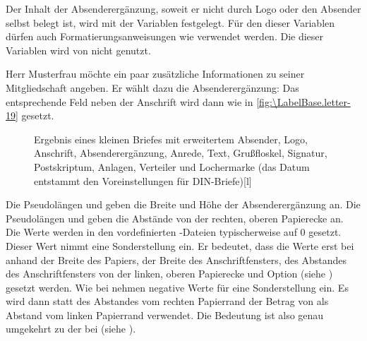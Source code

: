 \begin{Declaration}
\end{Declaration}
Der Inhalt der Absenderergänzung, soweit er nicht durch Logo oder den Absender
selbst belegt ist, wird mit der Variablen  festgelegt. Für
den  dieser Variablen dürfen auch Formatierungsanweisungen wie
 verwendet werden. Die  dieser Variablen
wird von \KOMAScript{} nicht genutzt.

\begin{Example}
  Herr Musterfrau möchte ein paar zusätzliche Informationen zu seiner
  Mitgliedschaft angeben. Er wählt dazu die Absenderergänzung:%
  Das entsprechende Feld neben der Anschrift wird dann wie in
  \autoref{fig:\LabelBase.letter-19} gesetzt.
  \begin{figure}
    \setcapindent{0pt}%
    \begin{captionbeside}{Ergebnis
        eines kleinen Briefes mit erweitertem Absender, Logo, 
        Anschrift, Absenderergänzung, Anrede, Text, Grußfloskel, Signatur,
        Postskriptum, Anlagen, Verteiler und Lochermarke (das Datum entstammt
        den Voreinstellungen für DIN-Briefe)}[l]
    \end{captionbeside}
    \label{fig:\LabelBase.letter-19}
  \end{figure}
\end{Example}
%
\EndIndexGroup
\EndIndexGroup
\ExampleEndFix %


\begin{Declaration}
\end{Declaration}
Die Pseudolängen  und
 geben die Breite und
Höhe der Absenderergänzung an. Die Pseudolängen  und
 geben die Abstände von der rechten, oberen
Papierecke an. Die Werte werden in den vordefinierten -Dateien
typischerweise auf 0 gesetzt. Dieser Wert nimmt
eine Sonderstellung ein. Er bedeutet, dass die Werte erst bei
 anhand der Breite des
Papiers, der Breite des Anschriftfensters, des Abstandes des
Anschriftfensters von der linken, oberen Papierecke und
Option  (siehe
)
gesetzt werden. Wie bei  nehmen
negative Werte für  eine Sonderstellung ein. Es wird dann
statt des Abstandes vom rechten Papierrand der Betrag von 
als Abstand vom linken Papierrand verwendet. Die Bedeutung ist also genau
umgekehrt zu der bei  (siehe
).%
\EndIndexGroup
%
\EndIndexGroup


